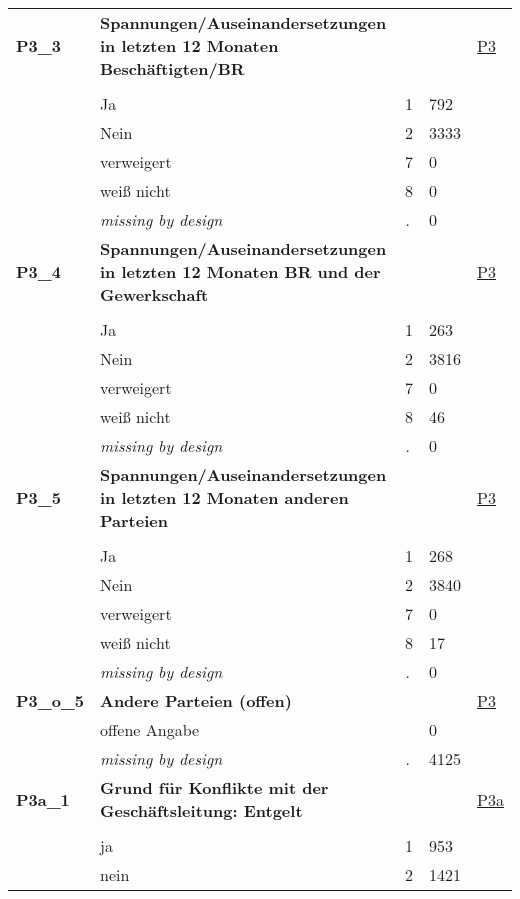 \begin{longtable}{| L{2.65cm} | L{8cm} | C{1.5cm} | R{1.25cm} | C{2.25cm}  |}
   \midrule
\textbf{P3\_3}\label{var:P3:3} & \textbf{Spannungen/Auseinandersetzungen in letzten 12 Monaten Beschäftigten/BR} &  &  & \hyperref[P3]{P3} \\ 
   &  &  &  &  \\ 
   & Ja & 1 & 792 &  \\ 
   & Nein & 2 & 3333 &  \\ 
   & verweigert & 7 & 0 &  \\ 
   & weiß nicht & 8 & 0 &  \\ 
   & \textit{missing by design} & \textit{.} & 0 &  \\ 
   \midrule
\textbf{P3\_4}\label{var:P3:4} & \textbf{Spannungen/Auseinandersetzungen in letzten 12 Monaten BR und der Gewerkschaft} &  &  & \hyperref[P3]{P3} \\ 
   &  &  &  &  \\ 
   & Ja & 1 & 263 &  \\ 
   & Nein & 2 & 3816 &  \\ 
   & verweigert & 7 & 0 &  \\ 
   & weiß nicht & 8 & 46 &  \\ 
   & \textit{missing by design} & \textit{.} & 0 &  \\ 
   \midrule
\textbf{P3\_5}\label{var:P3:5} & \textbf{Spannungen/Auseinandersetzungen in letzten 12 Monaten anderen Parteien} &  &  & \hyperref[P3]{P3} \\ 
   &  &  &  &  \\ 
   & Ja & 1 & 268 &  \\ 
   & Nein & 2 & 3840 &  \\ 
   & verweigert & 7 & 0 &  \\ 
   & weiß nicht & 8 & 17 &  \\ 
   & \textit{missing by design} & \textit{.} & 0 &  \\ 
   \midrule
\textbf{P3\_o\_5}\label{var:P3:o:5} & \textbf{Andere Parteien (offen)} &  &  & \hyperref[P3]{P3} \\ 
   & offene Angabe &  & 0 &  \\ 
   & \textit{missing by design} & \textit{.} & 4125 &  \\ 
   \midrule
\textbf{P3a\_1}\label{var:P3a:1} & \textbf{Grund für Konflikte mit der Geschäftsleitung: Entgelt} &  &  & \hyperref[P3a]{P3a} \\ 
   &  &  &  &  \\ 
   & ja & 1 & 953 &  \\ 
   & nein & 2 & 1421 &  \\ 

\end{longtable}
